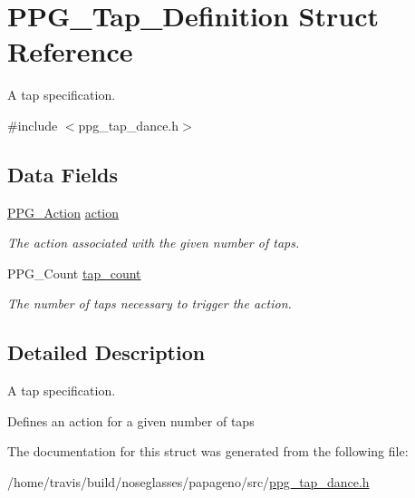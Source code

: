 \hypertarget{structPPG__Tap__Definition}{\section{P\-P\-G\-\_\-\-Tap\-\_\-\-Definition Struct Reference}
\label{structPPG__Tap__Definition}
}


A tap specification.  




{\ttfamily \#include $<$ppg\-\_\-tap\-\_\-dance.\-h$>$}

\subsection*{Data Fields}
\begin{DoxyCompactItemize}
\item 
\hypertarget{structPPG__Tap__Definition_a5280ddc51c3808c6b42556595e98d9f2}{\hyperlink{structPPG__Action}{P\-P\-G\-\_\-\-Action} \hyperlink{structPPG__Tap__Definition_a5280ddc51c3808c6b42556595e98d9f2}{action}}\label{structPPG__Tap__Definition_a5280ddc51c3808c6b42556595e98d9f2}

\begin{DoxyCompactList}\small\item\em The action associated with the given number of taps. \end{DoxyCompactList}\item 
\hypertarget{structPPG__Tap__Definition_a29d3d82ef28bf0d91debf10bea5fde85}{P\-P\-G\-\_\-\-Count \hyperlink{structPPG__Tap__Definition_a29d3d82ef28bf0d91debf10bea5fde85}{tap\-\_\-count}}\label{structPPG__Tap__Definition_a29d3d82ef28bf0d91debf10bea5fde85}

\begin{DoxyCompactList}\small\item\em The number of taps necessary to trigger the action. \end{DoxyCompactList}\end{DoxyCompactItemize}


\subsection{Detailed Description}
A tap specification. 

Defines an action for a given number of taps 

The documentation for this struct was generated from the following file\-:\begin{DoxyCompactItemize}
\item 
/home/travis/build/noseglasses/papageno/src/\hyperlink{ppg__tap__dance_8h}{ppg\-\_\-tap\-\_\-dance.\-h}\end{DoxyCompactItemize}
